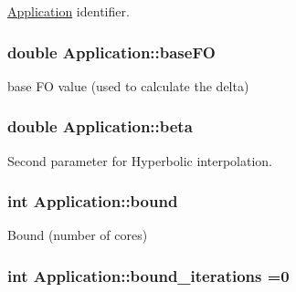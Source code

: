 \hyperlink{classApplication}{Application} identifier. 

\hypertarget{classApplication_aa703e7525d446d98b5cd51c959d35998}{
\subsubsection[{base\-F\-O}]{\setlength{\rightskip}{0pt plus 5cm}double Application\-::base\-F\-O\hspace{0.3cm}{\ttfamily [private]}}}\label{classApplication_aa703e7525d446d98b5cd51c959d35998}


base F\-O value (used to calculate the delta) 

\hypertarget{classApplication_a356ffae49ae223b3d98b57e56210e3a9}{
\subsubsection[{beta}]{\setlength{\rightskip}{0pt plus 5cm}double Application\-::beta\hspace{0.3cm}{\ttfamily [private]}}}\label{classApplication_a356ffae49ae223b3d98b57e56210e3a9}


Second parameter for Hyperbolic interpolation. 

\hypertarget{classApplication_a6e91bef9d503af0e8ba38c8f445c8cb0}{
\subsubsection[{bound}]{\setlength{\rightskip}{0pt plus 5cm}int Application\-::bound\hspace{0.3cm}{\ttfamily [private]}}}\label{classApplication_a6e91bef9d503af0e8ba38c8f445c8cb0}


Bound (number of cores) 

\hypertarget{classApplication_aa8ce75259c9f7e5a80bad43ff963a2a8}{
\subsubsection[{bound\-\_\-iterations}]{\setlength{\rightskip}{0pt plus 5cm}int Application\-::bound\-\_\-iterations =0\hspace{0.3cm}{\ttfamily [private]}}}\label{classApplication_aa8ce75259c9f7e5a80bad43ff963a2a8}


